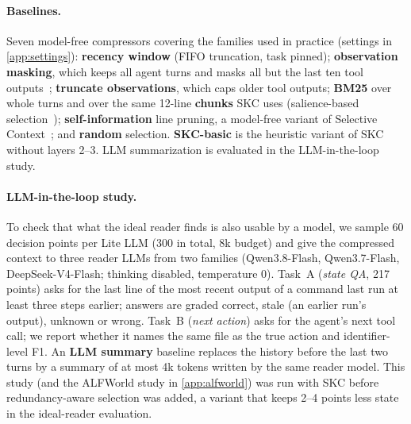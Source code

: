 \paragraph{Baselines.} Seven model-free compressors covering the families used
in practice (settings in \cref{app:settings}): \textbf{recency window} (FIFO
truncation, task pinned); \textbf{observation masking}, which keeps all agent
turns and masks all but the last ten tool outputs~\citep{lindenbauer2025complexity};
\textbf{truncate observations}, which caps older tool outputs; \textbf{BM25} over
whole turns and over the same 12-line \textbf{chunks} SKC uses (salience-based
selection~\citep{robertson2009bm25}); \textbf{self-information} line pruning, a
model-free variant of Selective Context~\citep{li2023selective}; and
\textbf{random} selection. \textbf{SKC-basic} is the heuristic variant of SKC
without layers 2--3. LLM summarization is evaluated in the LLM-in-the-loop study.

\paragraph{LLM-in-the-loop study.} To check that what the ideal reader finds is
also usable by a model, we sample 60 decision points per Lite LLM (300 in total,
8k budget) and give the compressed context to three reader LLMs from two
families (Qwen3.8-Flash, Qwen3.7-Flash, DeepSeek-V4-Flash; thinking disabled,
temperature 0). Task~A (\emph{state QA}, 217 points) asks for the last line of
the most recent output of a command last run at least three steps earlier;
answers are graded correct, stale (an earlier run's output), unknown or wrong.
Task~B (\emph{next action}) asks for the agent's next tool call; we report
whether it names the same file as the true action and identifier-level F1. An
\textbf{LLM summary} baseline replaces the history before the last two turns by
a summary of at most 4k tokens written by the same reader model. This study (and the ALFWorld study in
\cref{app:alfworld}) was run with SKC before redundancy-aware selection was
added, a variant that keeps 2--4 points less state in the ideal-reader
evaluation.

